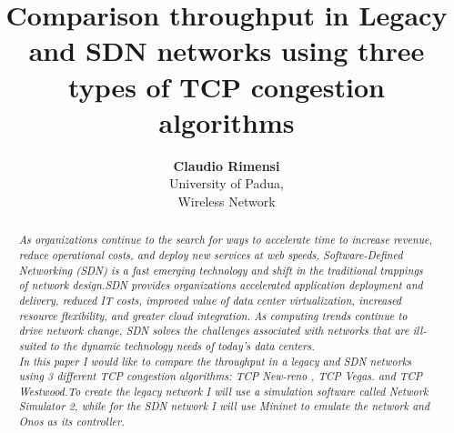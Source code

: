 \title{\textbf{Comparison throughput in Legacy and SDN networks using three types of TCP congestion algorithms}}
\author{\textbf{ Claudio Rimensi}\\University of Padua,\\Wireless Network} 
\maketitle
\begin{abstract}
{\emph{\footnotesize As organizations continue to the search for ways to accelerate time to increase revenue, reduce operational costs, and deploy new services at web speeds, Software-Defined Networking (SDN) is a fast emerging technology and shift in the traditional trappings of network design.SDN provides organizations accelerated application deployment and delivery, reduced IT costs, improved value of data center virtualization, increased resource flexibility, and greater cloud integration.   As computing trends continue to drive network change, SDN solves the challenges associated with networks that are ill-suited to the dynamic technology needs of today’s data centers.\\In this paper I would like to compare the throughput in a legacy and SDN networks using 3 different TCP congestion algorithms: TCP New-reno , TCP Vegas. and TCP Westwood.To create the legacy network I will use a simulation software called Network Simulator 2, while for the SDN network I will use Mininet to emulate the network and Onos as its controller.}}
\end{abstract}
